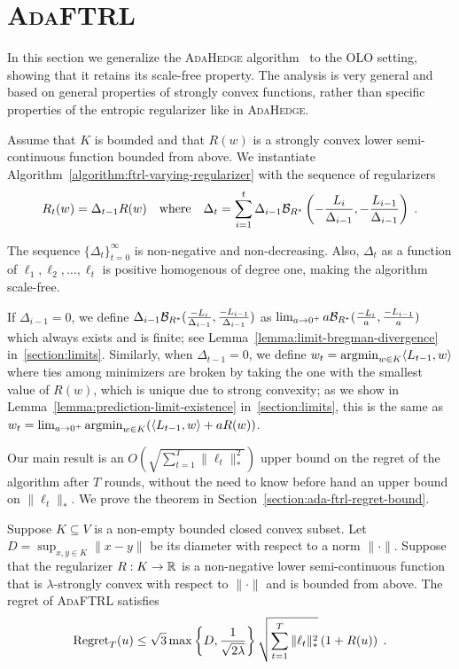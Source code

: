\section{\textsc{AdaFTRL}}
\label{section:ada-ftrl}

In this section we generalize the \textsc{AdaHedge}
algorithm~\cite{de-Rooij-van-Erven-Grunwald-Koolen-2014} to the OLO setting,
showing that it retains its scale-free property. The analysis is very general
and based on general properties of strongly convex functions, rather than
specific properties of the entropic regularizer like in \textsc{AdaHedge}.

Assume that $K$ is bounded and that $R(w)$ is a strongly convex lower
semi-continuous function bounded from above.  We instantiate
Algorithm~\ref{algorithm:ftrl-varying-regularizer} with the sequence of
regularizers
\begin{equation}
\label{equation:ada-ftrl}
R_t(w) = \Delta_{t-1} R(w)
\quad \text{where}
\quad \Delta_{t}=\sum_{i=1}^{t} \Delta_{i-1} \mathcal{B}_{R^*}\left(- \frac{L_i}{\Delta_{i-1}}, -\frac{L_{i-1}}{\Delta_{i-1}}\right) \; .
\end{equation}

The sequence $\{\Delta_t\}_{t=0}^\infty$ is non-negative and non-decreasing.
Also, $\Delta_t$ as a function of $\ell_1, \ell_2, \dots, \ell_t$ is positive homogenous
of degree one, making the algorithm scale-free.

If $\Delta_{i-1} = 0$, we define $\Delta_{i-1}
\mathcal{B}_{R^*}(\frac{-L_i}{\Delta_{i-1}}, \frac{-L_{i-1}}{\Delta_{i-1}})$ as
$\lim_{a \to 0^+} a \mathcal{B}_{R^*}(\frac{-L_i}{a}, \frac{-L_{i-1}}{a})$ which
always exists and is finite; see Lemma~\ref{lemma:limit-bregman-divergence}
in~\ref{section:limits}.  Similarly, when $\Delta_{t-1} = 0$, we define $w_t =
\operatorname*{argmin}_{w \in K} \langle L_{t-1}, w \rangle$ where ties among minimizers are
broken by taking the one with the smallest value of $R(w)$, which is unique due
to strong convexity; as we show in Lemma~\ref{lemma:prediction-limit-existence}
in~\ref{section:limits}, this is the same as $w_t = \lim_{a \to 0^+}
\operatorname*{argmin}_{w \in K} (\langle L_{t-1}, w \rangle + aR(w))$.

Our main result is an $O(\sqrt{\sum_{t=1}^T \|\ell_t\|_*^2})$ upper bound on
the regret of the algorithm after $T$ rounds, without the need to know before
hand an upper bound on $\|\ell_t\|_*$.  We prove the theorem in
Section~\ref{section:ada-ftrl-regret-bound}.

\begin{theorem}
\label{theorem:ada-ftrl-regret-bound}
Suppose $K \subseteq V$ is a non-empty bounded closed convex subset. Let $D =
\sup_{x,y \in K} \|x - y\|$ be its diameter with respect to a norm $\|\cdot\|$.
Suppose that the regularizer $R:K \to \mathbb{R}$ is a non-negative lower
semi-continuous function that is $\lambda$-strongly convex with respect to
$\|\cdot\|$ and is bounded from above.  The regret of \textsc{AdaFTRL} satisfies
$$
\operatorname{Regret}_T(u) \le \sqrt{3} \max\left\{D, \frac{1}{\sqrt{2\lambda}} \right\} \sqrt{\sum_{t=1}^T \|\ell_t\|_*^2} \left(1 + R(u) \right) \; .
$$
\end{theorem}

